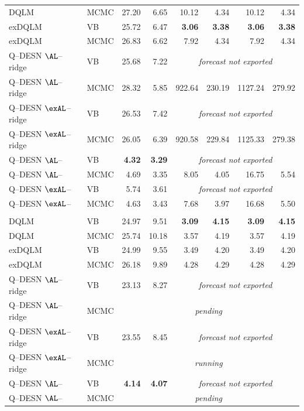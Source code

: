 \begin{table}[H]
\begin{tabular}{@{}llrrrrrr@{}}
DQLM & MCMC & 27.20 & 6.65 & 10.12 & 4.34 & 10.12 & 4.34 \\
exDQLM & VB & 25.72 & 6.47 & \textbf{3.06} & \textbf{3.38} & \textbf{3.06} & \textbf{3.38} \\
exDQLM & MCMC & 26.83 & 6.62 & 7.92 & 4.34 & 7.92 & 4.34 \\
Q--DESN \(\AL\)--ridge & VB & 25.68 & 7.22 & \multicolumn{4}{c}{\emph{forecast not exported}} \\
Q--DESN \(\AL\)--ridge & MCMC & 28.32 & 5.85 & 922.64 & 230.19 & 1127.24 & 279.92 \\
Q--DESN \(\exAL\)--ridge & VB & 26.53 & 7.42 & \multicolumn{4}{c}{\emph{forecast not exported}} \\
Q--DESN \(\exAL\)--ridge & MCMC & 26.05 & 6.39 & 920.58 & 229.84 & 1125.33 & 279.38 \\
Q--DESN \(\AL\)--\RHS{} & VB & \textbf{4.32} & \textbf{3.29} & \multicolumn{4}{c}{\emph{forecast not exported}} \\
Q--DESN \(\AL\)--\RHS{} & MCMC & 4.69 & 3.35 & 8.05 & 4.05 & 16.75 & 5.54 \\
Q--DESN \(\exAL\)--\RHS{} & VB & 5.74 & 3.61 & \multicolumn{4}{c}{\emph{forecast not exported}} \\
Q--DESN \(\exAL\)--\RHS{} & MCMC & 4.63 & 3.43 & 7.68 & 3.97 & 16.68 & 5.50 \\
\addlinespace[0.25em]
\multicolumn{8}{@{}l}{\emph{$\tau = 0.50$}}\\
DQLM & VB & 24.97 & 9.51 & \textbf{3.09} & \textbf{4.15} & \textbf{3.09} & \textbf{4.15} \\
DQLM & MCMC & 25.74 & 10.18 & 3.57 & 4.19 & 3.57 & 4.19 \\
exDQLM & VB & 24.99 & 9.55 & 3.49 & 4.20 & 3.49 & 4.20 \\
exDQLM & MCMC & 26.18 & 9.89 & 4.28 & 4.29 & 4.28 & 4.29 \\
Q--DESN \(\AL\)--ridge & VB & 23.13 & 8.27 & \multicolumn{4}{c}{\emph{forecast not exported}} \\
Q--DESN \(\AL\)--ridge & MCMC & \multicolumn{6}{c}{\emph{pending}} \\
Q--DESN \(\exAL\)--ridge & VB & 23.55 & 8.45 & \multicolumn{4}{c}{\emph{forecast not exported}} \\
Q--DESN \(\exAL\)--ridge & MCMC & \multicolumn{6}{c}{\emph{running}} \\
Q--DESN \(\AL\)--\RHS{} & VB & \textbf{4.14} & \textbf{4.07} & \multicolumn{4}{c}{\emph{forecast not exported}} \\
Q--DESN \(\AL\)--\RHS{} & MCMC & \multicolumn{6}{c}{\emph{pending}} \\

\end{tabular}
\end{table}

